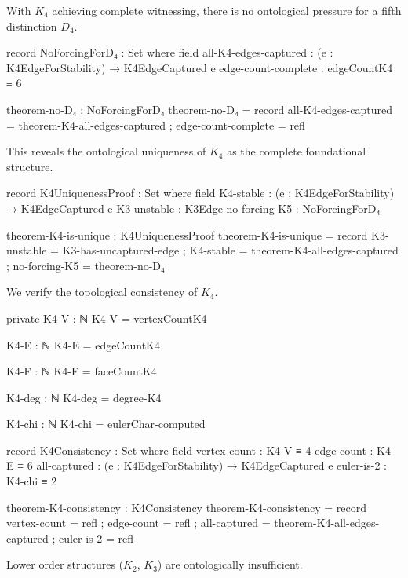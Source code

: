\documentclass[11pt,a4paper]{book}
\begin{document}
With $K_4$ achieving complete witnessing, there is no ontological pressure for a fifth distinction $D_4$.

\begin{code}
record NoForcingForD₄ : Set where
  field
    all-K4-edges-captured : (e : K4EdgeForStability) → K4EdgeCaptured e
    edge-count-complete : edgeCountK4 ≡ 6

theorem-no-D₄ : NoForcingForD₄
theorem-no-D₄ = record
  { all-K4-edges-captured = theorem-K4-all-edges-captured
  ; edge-count-complete = refl
  }

\end{code}

This reveals the ontological uniqueness of $K_4$ as the complete foundational structure.

\begin{code}
record K4UniquenessProof : Set where
  field
    K4-stable     : (e : K4EdgeForStability) → K4EdgeCaptured e
    K3-unstable   : K3Edge
    no-forcing-K5 : NoForcingForD₄

theorem-K4-is-unique : K4UniquenessProof
theorem-K4-is-unique = record
  { K3-unstable = K3-has-uncaptured-edge
  ; K4-stable = theorem-K4-all-edges-captured
  ; no-forcing-K5 = theorem-no-D₄
  }
\end{code}

We verify the topological consistency of $K_4$.

\begin{code}
private
  K4-V : ℕ
  K4-V = vertexCountK4

  K4-E : ℕ
  K4-E = edgeCountK4

  K4-F : ℕ
  K4-F = faceCountK4

  K4-deg : ℕ
  K4-deg = degree-K4

  K4-chi : ℕ
  K4-chi = eulerChar-computed

record K4Consistency : Set where
  field
    vertex-count     : K4-V ≡ 4
    edge-count       : K4-E ≡ 6
    all-captured     : (e : K4EdgeForStability) → K4EdgeCaptured e
    euler-is-2       : K4-chi ≡ 2

theorem-K4-consistency : K4Consistency
theorem-K4-consistency = record
  { vertex-count = refl
  ; edge-count   = refl
  ; all-captured = theorem-K4-all-edges-captured
  ; euler-is-2   = refl
  }
\end{code}

Lower order structures ($K_2$, $K_3$) are ontologically insufficient.
\end{document}
